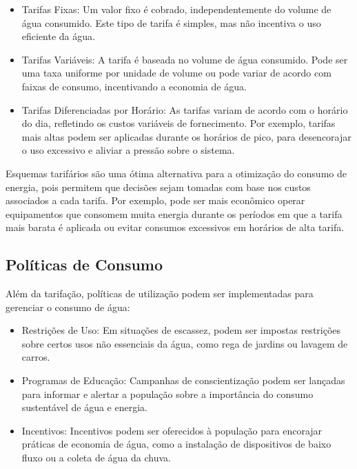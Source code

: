 \begin{itemize}

    \item[-] Tarifas Fixas: Um valor fixo é cobrado, independentemente do volume de água consumido. Este tipo de tarifa é simples, mas não incentiva o uso eficiente da água. 

    \item[-] Tarifas Variáveis: A tarifa é baseada no volume de água consumido. Pode ser uma taxa uniforme por unidade de volume ou pode variar de acordo com faixas de consumo, incentivando a economia de água. 

    \item[-] Tarifas Diferenciadas por Horário: As tarifas variam de acordo com o horário do dia, refletindo os custos variáveis de fornecimento. Por exemplo, tarifas mais altas podem ser aplicadas durante os horários de pico, para desencorajar o uso excessivo e aliviar a pressão sobre o sistema.

\end{itemize}


Esquemas tarifários são uma ótima alternativa para a otimização do consumo de energia, pois permitem que decisões sejam tomadas com base nos custos associados a cada tarifa. Por exemplo, pode ser mais econômico operar equipamentos que consomem muita energia durante os períodos em que a tarifa mais barata é aplicada ou evitar consumos excessivos em horários de alta tarifa. 


\subsection{Políticas de Consumo}

Além da tarifação, políticas de utilização podem ser implementadas para gerenciar o consumo de água: 

\begin{itemize}

\item[-] Restrições de Uso: Em situações de escassez, podem ser impostas restrições sobre certos usos não essenciais da água, como rega de jardins ou lavagem de carros. 

\item[-] Programas de Educação: Campanhas de conscientização podem ser lançadas para informar e alertar a população sobre a importância do consumo sustentável de água e energia.

\item[-] Incentivos: Incentivos podem ser oferecidos à população para encorajar práticas de economia de água, como a instalação de dispositivos de baixo fluxo ou a coleta de água da chuva. 

\end{itemize}

